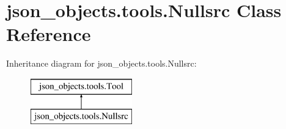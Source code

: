 \hypertarget{classjson__objects_1_1tools_1_1_nullsrc}{
\section{json\_\-objects.tools.Nullsrc Class Reference}
\label{classjson__objects_1_1tools_1_1_nullsrc}
}
Inheritance diagram for json\_\-objects.tools.Nullsrc:\begin{figure}[H]
\begin{center}
\leavevmode
\includegraphics[height=2.000000cm]{classjson__objects_1_1tools_1_1_nullsrc}
\end{center}
\end{figure}
